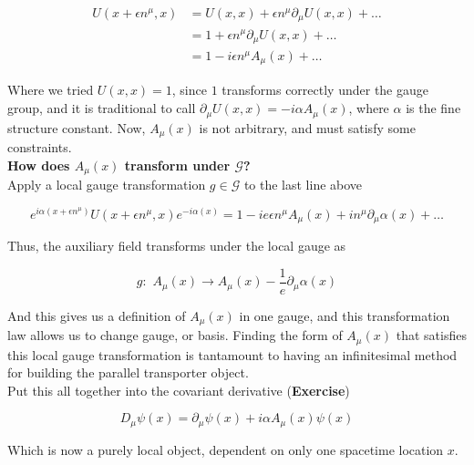 \begin{align}
U(x + \epsilon n^\mu , x) &= U (x,x) + \epsilon n^\mu \partial_\mu U(x,x) + \dots \\
&= 1 + \epsilon n^\mu \partial_\mu U(x,x) +\dots \\
&= 1 - i \epsilon n^\mu A_\mu (x) + \dots
\end{align}

\noindent Where we tried $U(x,x)=1$, since $1$ transforms correctly under the gauge group, and it is traditional to call $\partial_\mu U(x,x) = -i \alpha A_\mu (x)$, where $\alpha$ is the fine structure constant. Now, $A_\mu (x)$ is not arbitrary, and must satisfy some constraints. \\

\noindent \textbf{How does $A_\mu (x)$ transform under $\mathcal{G}$?} \\

\noindent Apply a local gauge transformation $g \in \mathcal{G}$ to the last line above

\begin{equation}
e^{i \alpha (x + \epsilon n^\mu)} U(x + \epsilon n^\mu, x) e^{-i \alpha(x)} = 1 - i e \epsilon n^\mu A_\mu (x) + i n^\mu \partial_\mu \alpha(x) + \dots
\end{equation}

\noindent Thus, the auxiliary field transforms under the local gauge as

\begin{equation}
g: \,\, A_\mu (x) \rightarrow A_\mu (x) - \frac{1}{e} \partial_\mu \alpha (x)
\end{equation}

\noindent And this gives us a definition of $A_\mu (x)$ in one gauge, and this transformation law allows us to change gauge, or basis. Finding the form of $A_\mu (x)$ that satisfies this local gauge transformation is tantamount to having an infinitesimal method for building the parallel transporter object. \\

\noindent Put this all together into the covariant derivative (\textbf{Exercise})

\begin{equation}
D_\mu \psi (x) = \partial_\mu \psi (x) + i \alpha A_\mu (x) \psi (x)
\end{equation}

\noindent Which is now a purely local object, dependent on only one spacetime location $x$. \\

